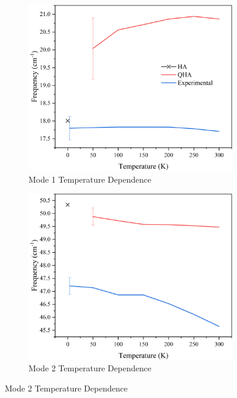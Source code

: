 \begin{figure}
\centering

\begin{subfigure}{0.45\textwidth}
\centering
\includegraphics[width=\textwidth]{Figures/Misc/QHA/Mode1CompV2G2.png}
\caption{Mode 1 Temperature Dependence}
\label{fig:mode1temp}
\end{subfigure}
\begin{subfigure}{0.45\textwidth}
\centering
\includegraphics[width=\textwidth]{Figures/Misc/QHA/Mode2CompV2G.png}
\caption{Mode 2 Temperature Dependence}
\label{fig:mode2temp}
\end{subfigure}


\end{figure}
